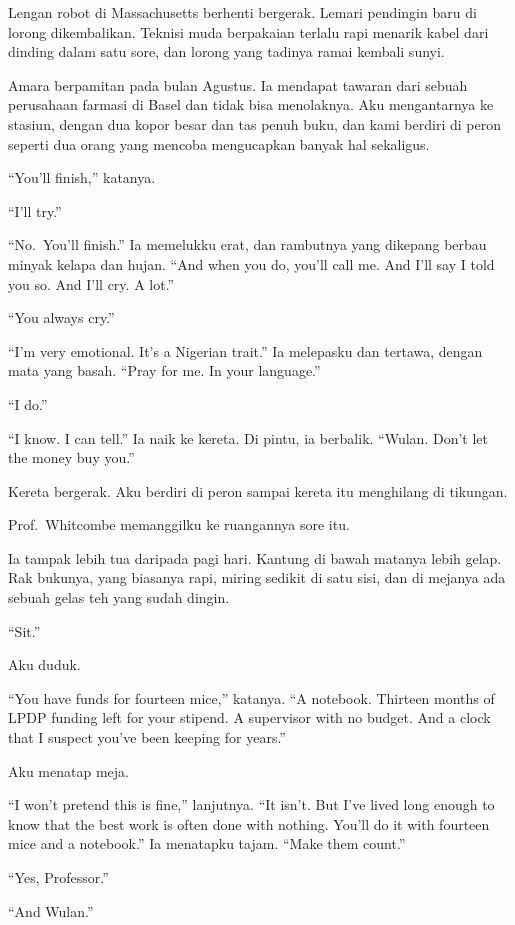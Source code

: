 \documentclass[11pt,twoside,openany]{book}
\begin{document}
Lengan robot di Massachusetts berhenti bergerak. Lemari pendingin baru di lorong dikembalikan. Teknisi muda berpakaian terlalu rapi menarik kabel dari dinding dalam satu sore, dan lorong yang tadinya ramai kembali sunyi.

Amara berpamitan pada bulan Agustus. Ia mendapat tawaran dari sebuah perusahaan farmasi di Basel dan tidak bisa menolaknya. Aku mengantarnya ke stasiun, dengan dua kopor besar dan tas penuh buku, dan kami berdiri di peron seperti dua orang yang mencoba mengucapkan banyak hal sekaligus.

``You'll finish,'' katanya.

``I'll try.''

``No.~You'll finish.'' Ia memelukku erat, dan rambutnya yang dikepang berbau minyak kelapa dan hujan. ``And when you do, you'll call me. And I'll say I told you so. And I'll cry. A lot.''

``You always cry.''

``I'm very emotional. It's a Nigerian trait.'' Ia melepasku dan tertawa, dengan mata yang basah. ``Pray for me. In your language.''

``I do.''

``I know. I can tell.'' Ia naik ke kereta. Di pintu, ia berbalik. ``Wulan. Don't let the money buy you.''

Kereta bergerak. Aku berdiri di peron sampai kereta itu menghilang di tikungan.

Prof.~Whitcombe memanggilku ke ruangannya sore itu.

Ia tampak lebih tua daripada pagi hari. Kantung di bawah matanya lebih gelap. Rak bukunya, yang biasanya rapi, miring sedikit di satu sisi, dan di mejanya ada sebuah gelas teh yang sudah dingin.

``Sit.''

Aku duduk.

``You have funds for fourteen mice,'' katanya. ``A notebook. Thirteen months of LPDP funding left for your stipend. A supervisor with no budget. And a clock that I suspect you've been keeping for years.''

Aku menatap meja.

``I won't pretend this is fine,'' lanjutnya. ``It isn't. But I've lived long enough to know that the best work is often done with nothing. You'll do it with fourteen mice and a notebook.'' Ia menatapku tajam. ``Make them count.''

``Yes, Professor.''

``And Wulan.''
\end{document}

